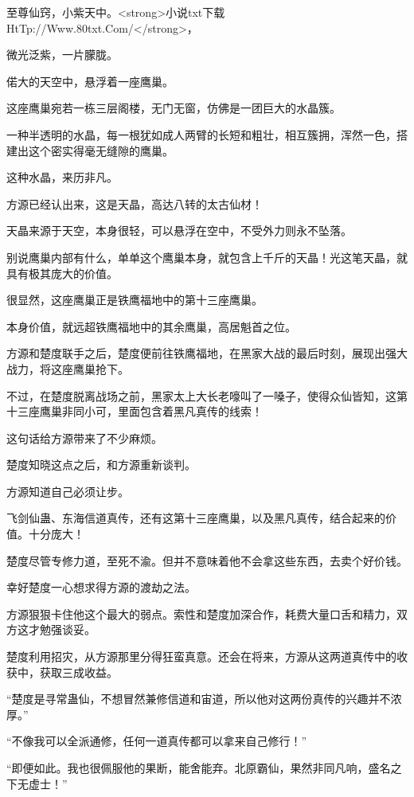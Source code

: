 
\begin{this_body}

至尊仙窍，小紫天中。<strong>小说txt下载HtTp://Www.80txt.Com/</strong>，

微光泛紫，一片朦胧。

偌大的天空中，悬浮着一座鹰巢。

这座鹰巢宛若一栋三层阁楼，无门无窗，仿佛是一团巨大的水晶簇。

一种半透明的水晶，每一根犹如成人两臂的长短和粗壮，相互簇拥，浑然一色，搭建出这个密实得毫无缝隙的鹰巢。

这种水晶，来历非凡。

方源已经认出来，这是天晶，高达八转的太古仙材！

天晶来源于天空，本身很轻，可以悬浮在空中，不受外力则永不坠落。

别说鹰巢内部有什么，单单这个鹰巢本身，就包含上千斤的天晶！光这笔天晶，就具有极其庞大的价值。

很显然，这座鹰巢正是铁鹰福地中的第十三座鹰巢。

本身价值，就远超铁鹰福地中的其余鹰巢，高居魁首之位。

方源和楚度联手之后，楚度便前往铁鹰福地，在黑家大战的最后时刻，展现出强大战力，将这座鹰巢抢下。

不过，在楚度脱离战场之前，黑家太上大长老嚎叫了一嗓子，使得众仙皆知，这第十三座鹰巢非同小可，里面包含着黑凡真传的线索！

这句话给方源带来了不少麻烦。

楚度知晓这点之后，和方源重新谈判。

方源知道自己必须让步。

飞剑仙蛊、东海信道真传，还有这第十三座鹰巢，以及黑凡真传，结合起来的价值。十分庞大！

楚度尽管专修力道，至死不渝。但并不意味着他不会拿这些东西，去卖个好价钱。

幸好楚度一心想求得方源的渡劫之法。

方源狠狠卡住他这个最大的弱点。索性和楚度加深合作，耗费大量口舌和精力，双方这才勉强谈妥。

楚度利用招灾，从方源那里分得狂蛮真意。还会在将来，方源从这两道真传中的收获中，获取三成收益。

“楚度是寻常蛊仙，不想冒然兼修信道和宙道，所以他对这两份真传的兴趣并不浓厚。”

“不像我可以全派通修，任何一道真传都可以拿来自己修行！”

“即便如此。我也很佩服他的果断，能舍能弃。北原霸仙，果然非同凡响，盛名之下无虚士！”


\end{this_body}
